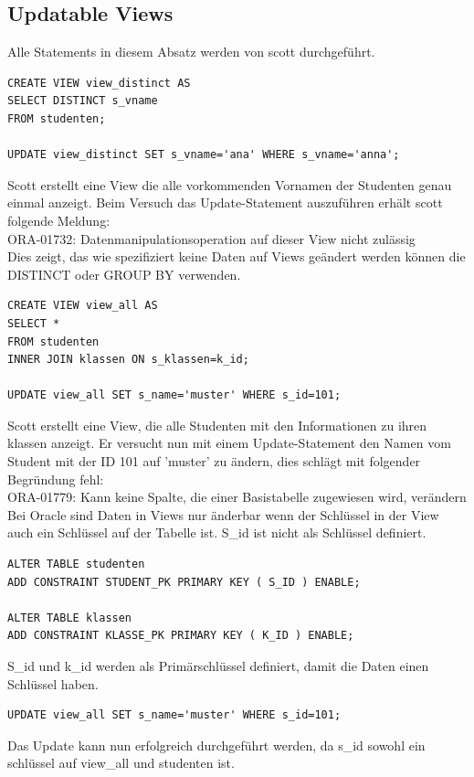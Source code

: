 \documentclass[10pt]{scrreprt}
\begin{document}
\subsection{Updatable Views}
Alle Statements in diesem Absatz werden von scott durchgeführt.
\begin{lstlisting}[style=sql]
CREATE VIEW view_distinct AS
SELECT DISTINCT s_vname
FROM studenten;

UPDATE view_distinct SET s_vname='ana' WHERE s_vname='anna';
\end{lstlisting}
Scott erstellt eine View die alle vorkommenden Vornamen der Studenten genau einmal anzeigt.
Beim Versuch das Update-Statement auszuführen erhält scott folgende Meldung:\\
ORA-01732: Datenmanipulationsoperation auf dieser View nicht zulässig\\
Dies zeigt, das wie spezifiziert keine Daten auf Views geändert werden können die DISTINCT oder GROUP BY verwenden.

\begin{lstlisting}[style=sql]
CREATE VIEW view_all AS
SELECT *
FROM studenten
INNER JOIN klassen ON s_klassen=k_id;

UPDATE view_all SET s_name='muster' WHERE s_id=101;
\end{lstlisting}
Scott erstellt eine View, die alle Studenten mit den Informationen zu ihren klassen anzeigt. Er versucht nun mit einem Update-Statement den Namen vom Student mit der ID 101 auf 'muster' zu ändern, dies schlägt mit folgender Begründung fehl:\\
ORA-01779: Kann keine Spalte, die einer Basistabelle zugewiesen wird, verändern\\
Bei Oracle sind Daten in Views nur änderbar wenn der Schlüssel in der View auch ein Schlüssel auf der Tabelle ist. S\_id ist nicht als Schlüssel definiert.

\begin{lstlisting}[style=sql]
ALTER TABLE studenten
ADD CONSTRAINT STUDENT_PK PRIMARY KEY ( S_ID ) ENABLE;

ALTER TABLE klassen
ADD CONSTRAINT KLASSE_PK PRIMARY KEY ( K_ID ) ENABLE;
\end{lstlisting}
S\_id und k\_id werden als Primärschlüssel definiert, damit die Daten einen Schlüssel haben.

\begin{lstlisting}[style=sql]
UPDATE view_all SET s_name='muster' WHERE s_id=101;
\end{lstlisting}
Das Update kann nun erfolgreich durchgeführt werden, da s\_id sowohl ein schlüssel auf view\_all und studenten ist.
\end{document}
